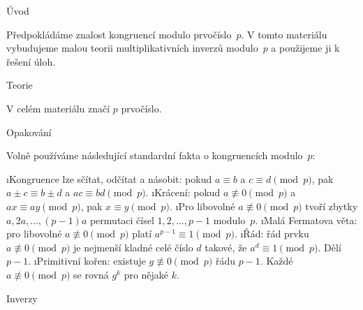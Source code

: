 





\sec Úvod

Předpokládáme znalost kongruencí modulo prvočíslo~$p$. V tomto materiálu vybudujeme malou teorii multiplikativních inverzů modulo~$p$ a použijeme ji k řešení úloh.

\sec Teorie

V celém materiálu značí $p$ prvočíslo.

\secc Opakování

Volně používáme následující standardní fakta o kongruencích modulo~$p$:

\begitems
\i Kongruence lze sčítat, odčítat a násobit: pokud $a \equiv b$ a $c \equiv d \pmod{p}$, pak $a \pm c \equiv b \pm d$ a $ac \equiv bd \pmod{p}$.
\i Krácení: pokud $a \not\equiv 0 \pmod{p}$ a $ax \equiv ay \pmod{p}$, pak $x \equiv y \pmod{p}$.
\i Pro libovolné $a \not\equiv 0 \pmod{p}$ tvoří zbytky $a, 2a, \ldots, (p-1)a$ permutaci čísel $1, 2, \ldots, p-1$ modulo~$p$.
\i Malá Fermatova věta: pro libovolné $a \not\equiv 0 \pmod{p}$ platí $a^{p-1} \equiv 1 \pmod{p}$.
\i Řád: řád prvku $a \not\equiv 0 \pmod{p}$ je nejmenší kladné celé číslo $d$ takové, že $a^d \equiv 1 \pmod{p}$. Dělí $p - 1$.
\i Primitivní kořen: existuje $g \not\equiv 0 \pmod{p}$ řádu $p - 1$. Každé $a \not\equiv 0 \pmod{p}$ se rovná $g^k$ pro nějaké $k$.
\enditems

\secc Inverzy


